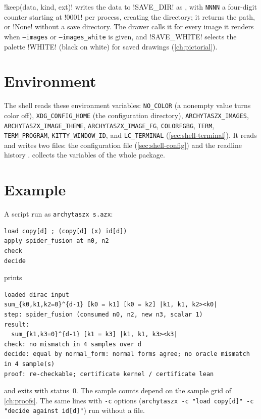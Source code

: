 \py!keep(data, kind, ext)! writes the data to \py!SAVE_DIR! as , with \texttt{NNNN} a four-digit counter starting at \code!0001! per process, creating the directory; it returns the path, or \py!None! without a save directory. The drawer calls it for every image it renders when \texttt{--images} or \texttt{--images\_white} is given, and \py!SAVE_WHITE! selects the palette \py!WHITE! (black on white) for saved drawings (\cref{ch:pictorial}).

\section{Environment}\label{sec:shell-env}

The shell reads these environment variables: \texttt{NO\_COLOR} (a nonempty value turns color off), \texttt{XDG\_CONFIG\_HOME} (the configuration directory), \texttt{ARCHYTASZX\_IMAGES}, \texttt{ARCHYTASZX\_IMAGE\_THEME}, \texttt{ARCHYTASZX\_IMAGE\_FG}, \texttt{COLORFGBG}, \texttt{TERM}, \texttt{TERM\_PROGRAM}, \texttt{KITTY\_WINDOW\_ID}, and \texttt{LC\_TERMINAL} (\cref{sec:shell-terminal}). It reads and writes two files: the configuration file (\cref{sec:shell-config}) and the readline history .  collects the variables of the whole package.

\section{Example}\label{sec:shell-example}

A script run as \texttt{archytaszx s.azx}:
\begin{lstlisting}[style=azx]
load copy[d] ; (copy[d] (x) id[d])
apply spider_fusion at n0, n2
check
decide
\end{lstlisting}
prints
\begin{lstlisting}[style=grammar]
loaded dirac input
sum_{k0,k1,k2=0}^{d-1} [k0 = k1] [k0 = k2] |k1, k1, k2><k0|
step: spider_fusion (consumed n0, n2, new n3, scalar 1)
result:
  sum_{k1,k3=0}^{d-1} [k1 = k3] |k1, k1, k3><k3|
check: no mismatch in 4 samples over d
decide: equal by normal_form: normal forms agree; no oracle mismatch in 4 sample(s)
proof: re-checkable; certificate kernel / certificate lean
\end{lstlisting}
and exits with status~0. The sample counts depend on the sample grid of \cref{ch:proofs}. The same lines with \texttt{-c} options (\texttt{archytaszx -c "load copy[d]" -c "decide against id[d]"}) run without a file.
